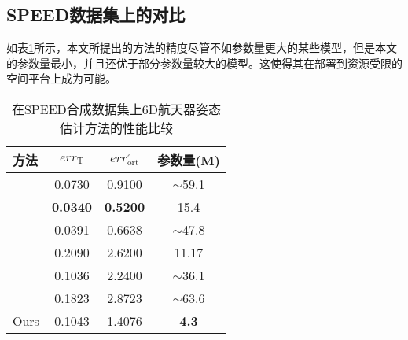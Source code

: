 \subsection{SPEED数据集上的对比}
如表\ref{tab:SPEED_Comparison}所示，本文所提出的方法的精度尽管不如参数量更大的某些模型，但是本文的参数量最小，并且还优于部分参数量较大的模型。这使得其在部署到资源受限的空间平台上成为可能。
\begin{table}[htbp]
	\centering
	\caption{在SPEED合成数据集上6D航天器姿态估计方法的性能比较}
	\label{tab:SPEED_Comparison}
	\begin{tabular}{lccc}
		\toprule
		方法 & $err_{\text{T}}$ & $err_{\text{ort}}^{\circ}$ & 参数量(M) \\
		\midrule
		\citet{gerard2019segmentation} & 0.0730 & 0.9100 & $\sim$59.1 \\
		\citet{lotti2022investigating} & \textbf{0.0340} & \textbf{0.5200} & 15.4 \\
		\citet{wang2022revisiting} & 0.0391 & 0.6638 & $\sim$47.8 \\
		\citet{park2019towards} & 0.2090 & 2.6200 & 11.17 \\
		\citet{piazza2021deep} & 0.1036 & 2.2400 & $\sim$36.1 \\
		\citet{huan2020pose} & 0.1823 & 2.8723 & $\sim$63.6 \\
		Ours & 0.1043 & 1.4076 & \textbf{4.3} \\
		\bottomrule
	\end{tabular}
\end{table}

